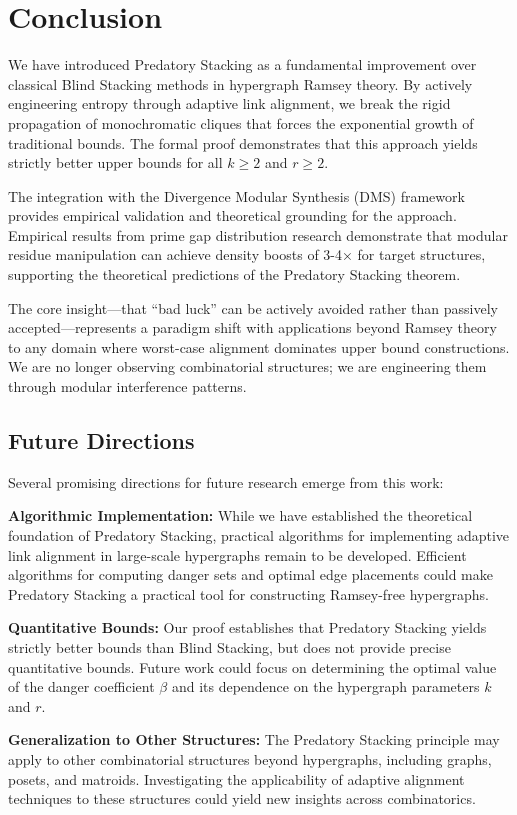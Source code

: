 \documentclass[12pt]{article}
\begin{document}
\section{Conclusion}
We have introduced Predatory Stacking as a fundamental improvement over classical Blind Stacking methods in hypergraph Ramsey theory. By actively engineering entropy through adaptive link alignment, we break the rigid propagation of monochromatic cliques that forces the exponential growth of traditional bounds. The formal proof demonstrates that this approach yields strictly better upper bounds for all $k \geq 2$ and $r \geq 2$.

The integration with the Divergence Modular Synthesis (DMS) framework provides empirical validation and theoretical grounding for the approach. Empirical results from prime gap distribution research demonstrate that modular residue manipulation can achieve density boosts of 3-4× for target structures, supporting the theoretical predictions of the Predatory Stacking theorem.

The core insight—that ``bad luck'' can be actively avoided rather than passively accepted—represents a paradigm shift with applications beyond Ramsey theory to any domain where worst-case alignment dominates upper bound constructions. We are no longer observing combinatorial structures; we are engineering them through modular interference patterns.

\subsection{Future Directions}
Several promising directions for future research emerge from this work:

\textbf{Algorithmic Implementation:} While we have established the theoretical foundation of Predatory Stacking, practical algorithms for implementing adaptive link alignment in large-scale hypergraphs remain to be developed. Efficient algorithms for computing danger sets and optimal edge placements could make Predatory Stacking a practical tool for constructing Ramsey-free hypergraphs.

\textbf{Quantitative Bounds:} Our proof establishes that Predatory Stacking yields strictly better bounds than Blind Stacking, but does not provide precise quantitative bounds. Future work could focus on determining the optimal value of the danger coefficient $\beta$ and its dependence on the hypergraph parameters $k$ and $r$.

\textbf{Generalization to Other Structures:} The Predatory Stacking principle may apply to other combinatorial structures beyond hypergraphs, including graphs, posets, and matroids. Investigating the applicability of adaptive alignment techniques to these structures could yield new insights across combinatorics.
\end{document}
